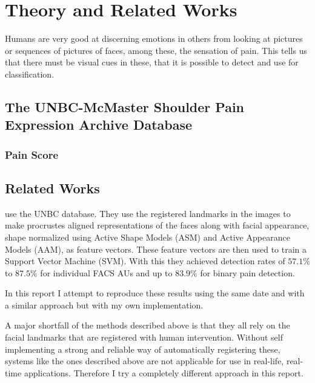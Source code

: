 \documentclass[Main]{subfiles}
\begin{document}
\section{Theory and Related Works} %
	\label{sec:theory_and_related_works}
	Humans are very good at discerning emotions in others from looking at pictures or sequences of pictures of faces, among these, the sensation of pain.
	This tells us that there must be visual cues in these, that it is possible to detect and use for classification.



	\subsection{The UNBC-McMaster Shoulder Pain Expression Archive Database} %
		\label{sub:unbc_mcmaster}
		
		\subsubsection{Pain Score} %
			\label{ssub:pain_score}
			


	\subsection{Related Works} %
		\label{sub:related_works}	


		 \cite{Ashraf2009a} use the UNBC database.
		They use the registered landmarks in the images to make procrustes aligned representations of the faces along with facial appearance, shape normalized using Active Shape Models (ASM) and Active Appearance Models (AAM), as feature vectors.
		These feature vectors are then used to train a Support Vector Machine (SVM).
		With this they achieved detection rates of $57.1\%$ to $87.5\%$ for individual FACS AUs and up to $83.9\%$ for binary pain detection.

		In this report I attempt to reproduce these results using the same date and with a similar approach but with my own implementation.

		A major shortfall of the methods described above is that they all  rely on the facial landmarks that are registered with human intervention.
		Without self implementing a strong and reliable way of automatically registering these, systems like the ones described above are not applicable for use in real-life, real-time applications.
		Therefore I try a completely different approach in this report. 
\end{document}
